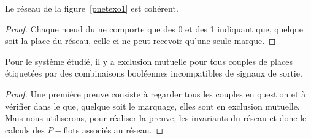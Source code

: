 \begin{thrm}
    Le réseau de la figure~\ref{pnetexo1} est cohérent.
\end{thrm}

\begin{proof}
    Chaque n\oe ud du \gma ne comporte que des 0 et des 1 indiquant que, quelque soit la place du
    réseau, celle ci ne peut recevoir qu'une seule marque.
\end{proof}

\begin{thrm}
    Pour le système étudié, il y a exclusion mutuelle pour tous couples de places étiquetées par des
    combinaisons booléennes incompatibles de signaux de sortie.
\end{thrm}

\begin{proof}
    Une première preuve consiste à regarder tous les couples en question et à vérifier dans le \gma
    que, quelque soit le marquage, elles sont en exclusion mutuelle. Mais nous utiliserons, pour
    réaliser la preuve, les invariants du réseau et donc le calculs des $P-$flots associés au
    réseau.


\end{proof}
